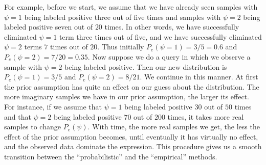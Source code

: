 For example, before we start, we assume that 
we have already seen samples with $\psi= 1$ being labeled positive
three out of five times and samples with
$\psi = 2$ being labeled positive seven out of $20$ times.
In other words, we
have successfully eliminated $\psi = 1$ term three times out of
five, and we have successfully eliminated $\psi = 2$ terms
$7$ times out of $20$.  Thus initially 
$P_e(\psi = 1) = 3/5 = 0.6$ and $P_e(\psi = 2) = 7/20 = 0.35$.
Now suppose we do a query in which we observe a
sample with $\psi = 2$ being labeled positive. Then our 
new distribution is
$P_e(\psi = 1) = 3/5$ and $P_e(\psi = 2) = 8/21$.
We continue in this manner.  At first the prior assumption 
has quite an effect on our guess about the
distribution. The more imaginary samples we have in our prior 
assumption, the larger its effect. 
For instance, if we assume that $\psi = 1$ being
labeled positive $30$ out of $50$ times and that
$\psi = 2$ being labeled positive $70$ out of $200$ times,
it takes more real samples to change $P_e(\psi)$.
With time, the more real samples we get, the less the
effect of the prior assumption becomes, 
until eventually it has virtually no
effect, and the observed data dominate the expression. 
This procedure gives us a smooth transition between the ``probabilistic'' 
and the ``empirical'' methods.

%
                     
%

